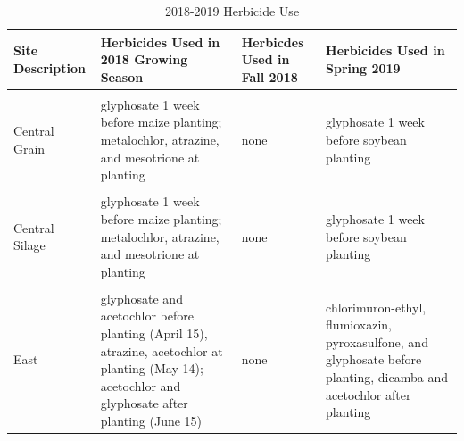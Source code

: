 \documentclass[
]{article}
\begin{document}
\newpage

\begin{table}[H]

\caption{\label{tab:herbtable}2018-2019 Herbicide Use}
\centering
\begin{tabular}[t]{>{\centering\arraybackslash}p{8em}>{\centering\arraybackslash}p{8em}>{\centering\arraybackslash}p{8em}>{\centering\arraybackslash}p{8em}}
\toprule
Site Description & Herbicides Used in 2018 Growing Season & Herbicdes Used in Fall 2018 & Herbicides Used in Spring 2019\\
\midrule
\cellcolor{gray!6}{Central Grain} & \cellcolor{gray!6}{glyphosate 1 week before soybean planting} & \cellcolor{gray!6}{none} & \cellcolor{gray!6}{glyphosate 1 week before maize planting; metalochlor, atrazine, and mesotrione at planting}\\
\cmidrule{1-4}
Central Grain & glyphosate 1 week before maize planting; metalochlor, atrazine, and mesotrione at planting & none & glyphosate 1 week before soybean planting\\
\cmidrule{1-4}
\cellcolor{gray!6}{Central Silage} & \cellcolor{gray!6}{glyphosate 1 week before soybean planting} & \cellcolor{gray!6}{none} & \cellcolor{gray!6}{glyphosate 1 week before maize planting; metalochlor, atrazine, and mesotrione at planting}\\
\cmidrule{1-4}
Central Silage & glyphosate 1 week before maize planting; metalochlor, atrazine, and mesotrione at planting & none & glyphosate 1 week before soybean planting\\
\cmidrule{1-4}
\cellcolor{gray!6}{West} & \cellcolor{gray!6}{glyphosate before planting; glyphosate and fluthiacet-methyl at planting} & \cellcolor{gray!6}{none} & \cellcolor{gray!6}{glyphosate before planting; glyphosate and fluthiacet-methyl at planting}\\
\cmidrule{1-4}
East & glyphosate and acetochlor  before planting (April 15), atrazine, acetochlor at planting (May 14); acetochlor and glyphosate after planting (June 15) & none & chlorimuron-ethyl, flumioxazin, pyroxasulfone, and glyphosate before planting, dicamba and acetochlor after planting\\
\bottomrule
\end{tabular}
\end{table}

\newpage
\end{document}
